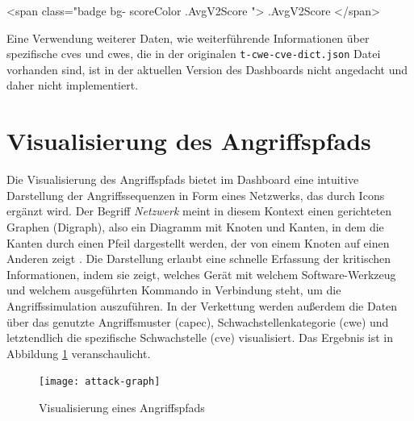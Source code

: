 \begin{code}[caption=Aufbau eines \gls{html} Elements zur Darstellung eines CVSS Werts in einer Bootstrap Komponente, label={listing:template-cvss}]
    <span class="badge bg-{{ scoreColor .AvgV2Score }}">{{ .AvgV2Score }}</span>
\end{code}

Eine Verwendung weiterer Daten, wie weiterführende Informationen über spezifische \glspl{cve} und \glspl{cwe}, die in der originalen \verb|t-cwe-cve-dict.json| Datei vorhanden sind, ist in der aktuellen Version des Dashboards nicht angedacht und daher nicht implementiert.

\section{Visualisierung des Angriffspfads}
\label{sec:impl-visualisierungDesAngriffspfads}
Die Visualisierung des Angriffspfads bietet im Dashboard eine intuitive Darstellung der Angriffssequenzen in Form eines Netzwerks, das durch Icons ergänzt wird. Der Begriff \textit{Netzwerk} meint in diesem Kontext einen gerichteten Graphen (Digraph), also ein Diagramm mit Knoten und Kanten, in dem die Kanten durch einen Pfeil dargestellt werden, der von einem Knoten auf einen Anderen zeigt \autocite{DigraphDefinition}. Die Darstellung erlaubt eine schnelle Erfassung der kritischen Informationen, indem sie zeigt, welches Gerät mit welchem Software-Werkzeug und welchem ausgeführten Kommando in Verbindung steht, um die Angriffssimulation auszuführen. In der Verkettung werden außerdem die Daten über das genutzte Angriffsmuster (\gls{capec}), Schwachstellenkategorie (\gls{cwe}) und letztendlich die spezifische Schwachstelle (\gls{cve}) visualisiert. Das Ergebnis ist in Abbildung \ref{fig:attack-graph} veranschaulicht.
\begin{figure}
    \centering
    \texttt{[image: attack-graph]}
    \caption{Visualisierung eines Angriffspfads}
    \label{fig:attack-graph}
\end{figure}

